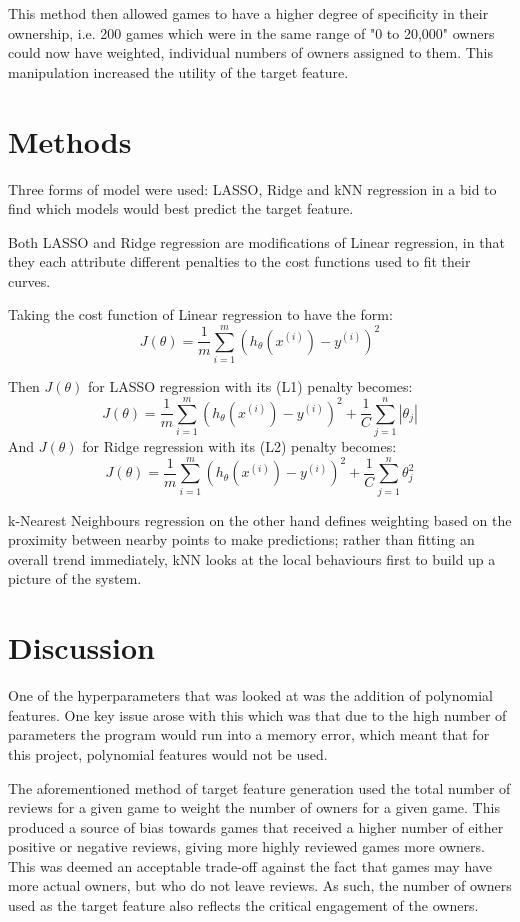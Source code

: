 This method then allowed games to have a higher degree of specificity in their ownership, i.e. 200 games which were in the same range of "0 to 20,000" owners could now have weighted, individual numbers of owners assigned to them. This manipulation increased the utility of the target feature.

\section{Methods}
Three forms of model were used: LASSO, Ridge and kNN regression in a bid to find which models would best predict the target feature.

Both LASSO and Ridge regression are modifications of Linear regression, in that they each attribute different penalties to the cost functions used to fit their curves.

Taking the cost function of Linear regression to have the form:
\[
J(\theta) = \frac{1}{m} \sum_{i=1}^m (h_{\theta}(x^{(i)}) - y^{(i)})^2
\]

Then $J(\theta)$ for LASSO regression with its (L1) penalty becomes:
\[
J(\theta) = \frac{1}{m} \sum_{i=1}^m (h_{\theta}(x^{(i)}) - y^{(i)})^2 + \frac{1}{C} \sum_{j=1}^n |\theta_j|
\]
And $J(\theta)$ for Ridge regression with its (L2) penalty becomes:
\[
J(\theta) = \frac{1}{m} \sum_{i=1}^m (h_{\theta}(x^{(i)}) - y^{(i)})^2 + \frac{1}{C} \sum_{j=1}^n \theta_j^2
\]

k-Nearest Neighbours regression on the other hand defines weighting based on the proximity between nearby points to make predictions; rather than fitting an overall trend immediately, kNN looks at the local behaviours first to build up a picture of the system.

\section{Discussion}

One of the hyperparameters that was looked at was the addition of polynomial features. One key issue arose with this which was that due to the high number of parameters the program would run into a memory error, which meant that for this project, polynomial features would not be used.

The aforementioned method of target feature generation used the total number of reviews for a given game to weight the number of owners for a given game. This produced a source of bias towards games that received a higher number of either positive or negative reviews, giving more highly reviewed games more owners. This was deemed an acceptable trade-off against the fact that games may have more actual owners, but who do not leave reviews. As such, the number of owners used as the target feature also reflects the critical engagement of the owners.

